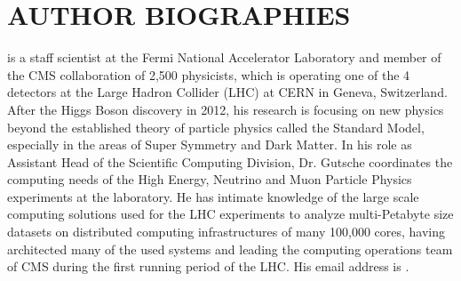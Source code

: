 \documentclass{wscpaperproc}
\theoremstyle{wsc}
\begin{document}
\appendix





\section*{AUTHOR BIOGRAPHIES}

 is a staff scientist at the Fermi National Accelerator Laboratory and member of the CMS collaboration of 2,500 physicists, which is operating one of the 4 detectors at the Large Hadron Collider (LHC) at CERN in Geneva, Switzerland. After the Higgs Boson discovery in 2012, his research is focusing on new physics beyond the established theory of particle physics called the Standard Model, especially in the areas of Super Symmetry and Dark Matter. In his role as Assistant Head of the Scientific Computing Division, Dr. Gutsche coordinates the computing needs of the High Energy, Neutrino and Muon Particle Physics experiments at the laboratory. He has intimate knowledge of the large scale computing solutions used for the LHC experiments to analyze multi-Petabyte size datasets on distributed computing infrastructures of many 100,000 cores, having architected many of the used systems and leading the computing operations team of CMS during the first running period of the LHC. His email address is .\\
\end{document}
